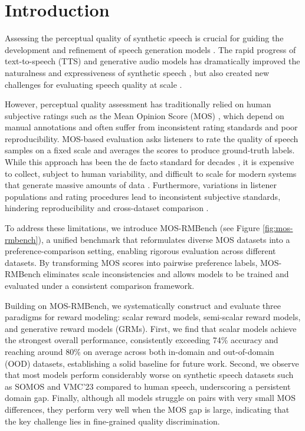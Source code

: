 \section{Introduction}

Assessing the perceptual quality of synthetic speech is crucial for guiding the development and refinement of speech generation models \citep{valentini2018speech}. The rapid progress of text-to-speech (TTS) and generative audio models has dramatically improved the naturalness and expressiveness of synthetic speech \citep{wang2025spark, xu2025qwen2}, but also created new challenges for evaluating speech quality at scale \citep{lo2019mosnet, huang2022voicemos}.





However, perceptual quality assessment has traditionally relied on human subjective ratings such as the Mean Opinion Score (MOS) \citep{international1996methods}, which depend on manual annotations and often suffer from inconsistent rating standards and poor reproducibility. MOS-based evaluation asks listeners to rate the quality of speech samples on a fixed scale and averages the scores to produce ground-truth labels. While this approach has been the de facto standard for decades \citep{international1996methods}, it is expensive to collect, subject to human variability, and difficult to scale for modern systems that generate massive amounts of data \citep{mittag2019non}. Furthermore, variations in listener populations and rating procedures lead to inconsistent subjective standards, hindering reproducibility and cross-dataset comparison \citep{pieper2024alignnet}.

To address these limitations, we introduce MOS-RMBench (see Figure \ref{fig:mos-rmbench}), a unified benchmark that reformulates diverse MOS datasets into a preference-comparison setting, enabling rigorous evaluation across different datasets. By transforming MOS scores into pairwise preference labels, MOS-RMBench eliminates scale inconsistencies and allows models to be trained and evaluated under a consistent comparison framework.

Building on MOS-RMBench, we systematically construct and evaluate three paradigms for reward modeling: scalar reward models, semi-scalar reward models, and generative reward models (GRMs). First, we find that scalar models achieve the strongest overall performance, consistently exceeding 74\% accuracy and reaching around 80\% on average across both in-domain and out-of-domain (OOD) datasets, establishing a solid baseline for future work. Second, we observe that most models perform considerably worse on synthetic speech datasets such as SOMOS \citep{somos} and VMC'23 \citep{vmc23} compared to human speech, underscoring a persistent domain gap. Finally, although all models struggle on pairs with very small MOS differences, they perform very well when the MOS gap is large, indicating that the key challenge lies in fine-grained quality discrimination.

